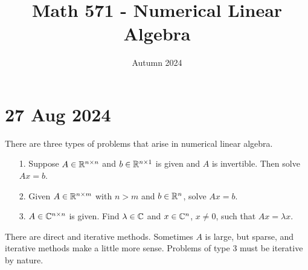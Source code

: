 \documentclass{article}
\title{Math 571 - Numerical Linear Algebra}
\author{Autumn 2024}
\begin{document}
   

\maketitle

\section*{27 Aug 2024}
There are three types of problems that arise in numerical linear algebra.
\begin{itemize}
    \item[1.] Suppose $A \in \mathbb{R}^{n \times n}$ and $b \in \mathbb{R}^{n \times 1}$ is given and $A$ is invertible. Then solve $Ax = b$.
    \item[2.] Given $A \in \mathbb{R}^{n \times m}$ with $n > m$ and $b \in \mathbb{R}^n$, solve $Ax = b$.
    \item[3.] $A \in \mathbb{C}^{n \times n}$ is given. Find $\lambda \in \mathbb{C}$ and $x \in \mathbb{C}^n$, $x \neq 0$, such that $Ax = \lambda x$.  
\end{itemize}

There are direct and iterative methods. Sometimes $A$ is large, but sparse, and iterative methods make a little more sense. Problems of type 3 must be iterative by nature. 

\newpar
\end{document}
